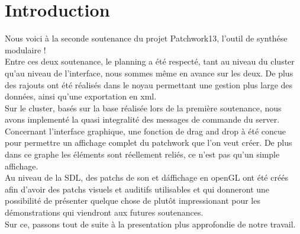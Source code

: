 \chapter{Introduction}

Nous voici \`a la seconde soutenance du projet Patchwork13, l'outil de 
synth\'ese modulaire !\\

Entre ces deux soutenance, le planning a \'et\'e respect\'e, tant au niveau du 
cluster qu'au niveau de l'interface, nous sommes m\^eme en avance sur les deux.
De plus des rajouts ont \'et\'e r\'ealis\'es dans le noyau permettant une 
gestion plus large des donn\'ees, ainsi qu'une exportation en xml.\\

Sur le cluster, bas\'es sur la base r\'ealis\'ee lors de la premi\`ere 
soutenance, nous avons implement\'e la quasi integralit\'e des messages de 
commande du server.\\

Concernant l'interface graphique, une fonction de drag and drop \`a \'et\'e 
concue pour permettre un affichage complet du patchwork que l'on veut cr\'eer.
De plus dans ce graphe les \'el\'ements sont r\'eellement reli\'es, ce n'est
pas qu'un simple affichage.\\

Au niveau de la SDL, des patchs de son et d\'affichage en openGL ont \'et\'e 
cr\'e\'es afin d'avoir des patchs visuels et auditifs utilisables et qui 
donneront une possibilit\'e de pr\'esenter quelque chose de plut\^ot 
impressionant pour les d\'emonstrations qui viendront aux futures soutenances.\\

Sur ce, passons tout de suite \`a la presentation plus approfondie de notre
travail.\\
